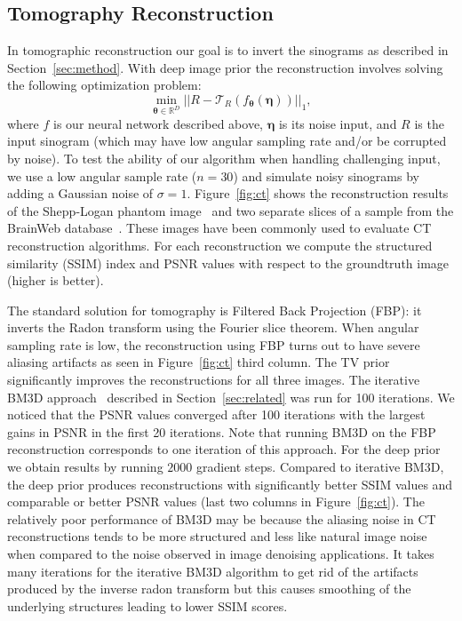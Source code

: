\subsection{Tomography Reconstruction}
In tomographic reconstruction our goal is to invert the sinograms as described in Section~\ref{sec:method}.
With deep image prior the reconstruction involves solving the following optimization problem:
\begin{equation}
	\min_{\bm{\theta} \in \mathbb{R}^D} ||R - \mathcal{T}_R(f_{\bm{\theta}}(\bm{\eta}))||_1,
\end{equation}
where $f$ is our neural network described above, $\bm{\eta}$ is its noise input, and $R$ is the input sinogram (which may have low angular sampling rate and/or be corrupted by noise). To test the ability of our algorithm when handling challenging input, we use a low angular sample rate ($n=30$) and simulate noisy sinograms by adding a Gaussian noise of $\sigma=1$.
Figure~\ref{fig:ct} shows the reconstruction results of the Shepp-Logan phantom image~\cite{shepp1974fourier} and two separate slices of a sample from the BrainWeb database~\cite{cocosco1997brainweb}.
These images have been commonly used to evaluate CT reconstruction algorithms.
For each reconstruction we compute the structured similarity (SSIM) index and PSNR values with respect to the groundtruth image (higher is better).

The standard solution for tomography is Filtered Back Projection (FBP): it inverts the Radon transform using the Fourier slice theorem. When angular sampling rate is low, the reconstruction using FBP turns out to have severe aliasing artifacts as seen in Figure~\ref{fig:ct} third column.
The TV prior significantly improves the reconstructions for all three images.
The iterative BM3D approach~\cite{maggioni2013nonlocal} described in Section~\ref{sec:related} was run for 100 iterations. We noticed that the PSNR values converged after 100 iterations with the largest gains in PSNR in the first 20 iterations.
Note that running BM3D on the FBP reconstruction corresponds to one iteration of this approach.
For the deep prior we obtain results by running $2000$ gradient steps.
Compared to iterative BM3D, the deep prior produces reconstructions with significantly better SSIM values and comparable or better PSNR values (last two columns in Figure~\ref{fig:ct}).
The relatively poor performance of BM3D may be because the aliasing noise in CT reconstructions tends to be more structured and less like natural image noise when compared to the noise observed in image denoising applications.
It takes many iterations for the iterative BM3D algorithm to get rid of the artifacts produced by the inverse radon transform but this causes smoothing of the underlying structures leading to lower SSIM scores.

